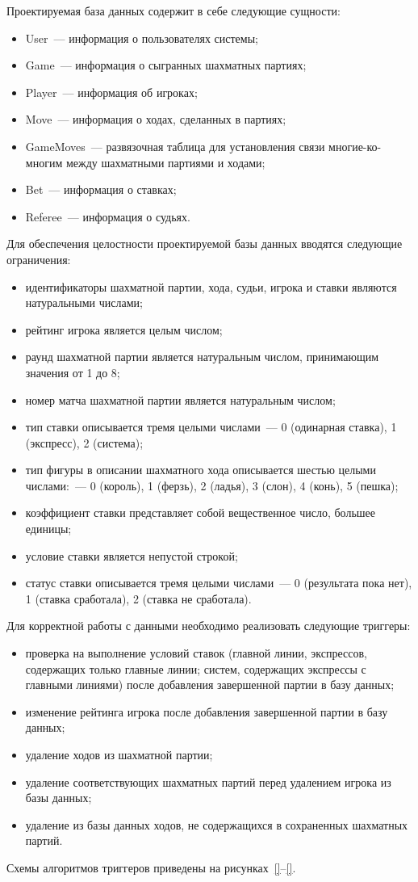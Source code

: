 Проектируемая база данных содержит в себе следующие сущности:
\begin{itemize}
	\item User~--- информация о пользователях системы;
	\item Game~--- информация о сыгранных шахматных партиях;
	\item Player~--- информация об игроках;
	\item Move~--- информация о ходах, сделанных в партиях;
	\item GameMoves~--- развязочная таблица для установления связи многие-ко-многим между шахматными партиями и ходами;
	\item Bet~--- информация о ставках;
	\item Referee~--- информация о судьях.
\end{itemize}

Для обеспечения целостности проектируемой базы данных вводятся следующие ограничения:
\begin{itemize}
	\item идентификаторы шахматной партии, хода, судьи, игрока и ставки являются натуральными числами;
	\item рейтинг игрока является целым числом;
	\item раунд шахматной партии является натуральным числом, принимающим значения от 1 до 8;
	\item номер матча шахматной партии является натуральным числом;
	\item тип ставки описывается тремя целыми числами~--- 0 (одинарная ставка), 1 (экспресс), 2 (система);
	\item тип фигуры в описании шахматного хода описывается шестью целыми числами:~--- 0 (король), 1 (ферзь), 2 (ладья), 3 (слон), 4 (конь), 5 (пешка);
	\item коэффициент ставки представляет собой вещественное число, большее единицы;
	\item условие ставки является непустой строкой;
	\item статус ставки описывается тремя целыми числами~--- 0 (результата пока нет), 1 (ставка сработала), 2 (ставка не сработала).
\end{itemize}

Для корректной работы с данными необходимо реализовать следующие триггеры:
\begin{itemize}
	\item проверка на выполнение условий ставок (главной линии, экспрессов, содержащих только главные линии; систем, содержащих экспрессы с главными линиями) после добавления завершенной партии в базу данных;
	\item изменение рейтинга игрока после добавления завершенной партии в базу данных;
	\item удаление ходов из шахматной партии;
	\item удаление соответствующих шахматных партий перед удалением игрока из базы данных;
	\item удаление из базы данных ходов, не содержащихся в сохраненных шахматных партий.
\end{itemize}

Схемы алгоритмов триггеров приведены на рисунках~\ref{}--\ref{}.


\clearpage
